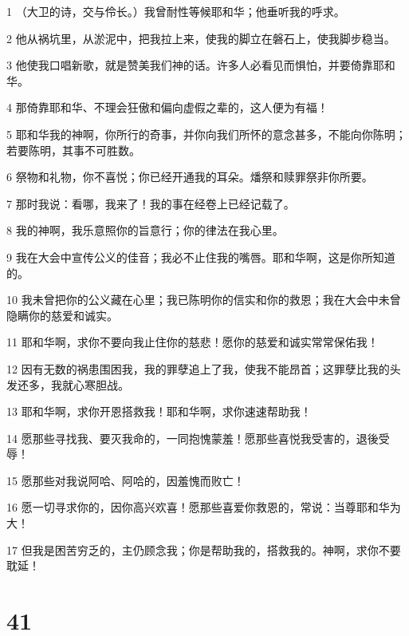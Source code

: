 \par 1 （大卫的诗，交与伶长。）我曾耐性等候耶和华；他垂听我的呼求。
\par 2 他从祸坑里，从淤泥中，把我拉上来，使我的脚立在磐石上，使我脚步稳当。
\par 3 他使我口唱新歌，就是赞美我们神的话。许多人必看见而惧怕，并要倚靠耶和华。
\par 4 那倚靠耶和华、不理会狂傲和偏向虚假之辈的，这人便为有福！
\par 5 耶和华我的神啊，你所行的奇事，并你向我们所怀的意念甚多，不能向你陈明；若要陈明，其事不可胜数。
\par 6 祭物和礼物，你不喜悦；你已经开通我的耳朵。燔祭和赎罪祭非你所要。
\par 7 那时我说：看哪，我来了！我的事在经卷上已经记载了。
\par 8 我的神啊，我乐意照你的旨意行；你的律法在我心里。
\par 9 我在大会中宣传公义的佳音；我必不止住我的嘴唇。耶和华啊，这是你所知道的。
\par 10 我未曾把你的公义藏在心里；我已陈明你的信实和你的救恩；我在大会中未曾隐瞒你的慈爱和诚实。
\par 11 耶和华啊，求你不要向我止住你的慈悲！愿你的慈爱和诚实常常保佑我！
\par 12 因有无数的祸患围困我，我的罪孽追上了我，使我不能昂首；这罪孽比我的头发还多，我就心寒胆战。
\par 13 耶和华啊，求你开恩搭救我！耶和华啊，求你速速帮助我！
\par 14 愿那些寻找我、要灭我命的，一同抱愧蒙羞！愿那些喜悦我受害的，退後受辱！
\par 15 愿那些对我说阿哈、阿哈的，因羞愧而败亡！
\par 16 愿一切寻求你的，因你高兴欢喜！愿那些喜爱你救恩的，常说：当尊耶和华为大！
\par 17 但我是困苦穷乏的，主仍顾念我；你是帮助我的，搭救我的。神啊，求你不要耽延！

\chapter{41}

